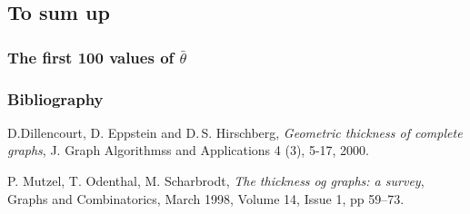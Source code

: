 \documentclass[12 pt]{beamer}
\begin{document}
    \subsection{To sum up}
    
\begin{frame}{}
    \frametitle{The first 100 values of  $\bar{\theta}$}
 
\end{frame}




\begin{frame}{}
    \frametitle{Bibliography}
    
    
    \begin{thebibliography}{ABC9999}

    D.Dillencourt, D. Eppstein and D.\,S. Hirschberg,
    \textit{Geometric thickness of complete graphs}, 
        J. Graph Algorithmss and Applications 4 (3), 5-17, 2000.
	    
    P. Mutzel, T. Odenthal, M. Scharbrodt, 
    \textit{The thickness og graphs: a survey}, 
        Graphs and Combinatorics, March 1998, Volume 14, Issue 1, pp 59–73.
    \end{thebibliography}
        
\end{frame}
\end{document}
